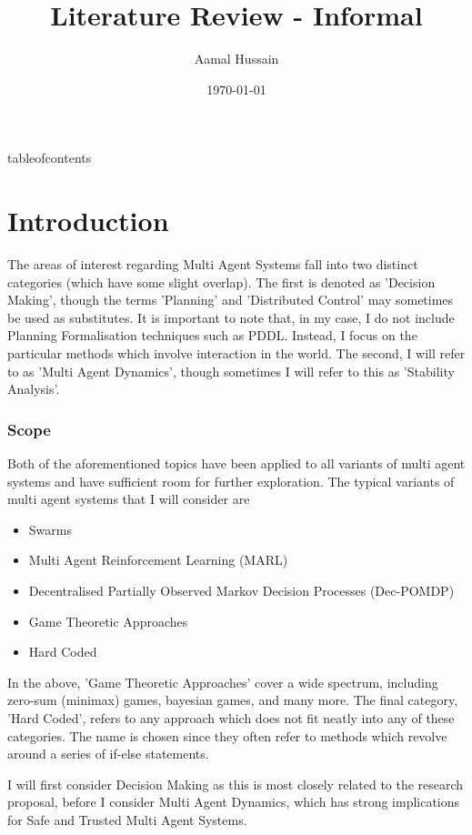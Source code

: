 \documentclass[preprint,11pt]{report}
\title{Literature Review - Informal}
\author{Aamal Hussain}
\date{\today}
\begin{document}
\maketitle tableofcontents

\chapter*{Introduction}



The areas of interest regarding Multi Agent Systems fall into two distinct categories (which have
some slight overlap). The first is denoted as 'Decision Making', though the terms 'Planning' and
'Distributed Control' may sometimes be used as substitutes. It is important to note that, in my
case, I do not include Planning Formalisation techniques such as PDDL. Instead, I focus on the
particular methods which involve interaction in the world. The second, I will refer to as 'Multi
Agent Dynamics', though sometimes I will refer to this as 'Stability Analysis'. 

\subsection*{Scope}

Both of the aforementioned topics have been applied to all variants of multi agent systems and have
sufficient room for further exploration. The typical variants of multi agent systems that I will
consider are

\begin{itemize} \item Swarms \item Multi Agent Reinforcement Learning (MARL) \item Decentralised
Partially Observed Markov Decision Processes (Dec-POMDP) \item Game Theoretic Approaches \item Hard
Coded \end{itemize}

In the above, 'Game Theoretic Approaches' cover a wide spectrum, including zero-sum (minimax) games,
bayesian games, and many more. The final category, 'Hard Coded', refers to any approach which does
not fit neatly into any of these categories. The name is chosen since they often refer to methods
which revolve around a series of if-else statements.

I will first consider Decision Making as this is most closely related to the research proposal,
before I consider Multi Agent Dynamics, which has strong implications for Safe and Trusted Multi
Agent Systems. 
\end{document}

